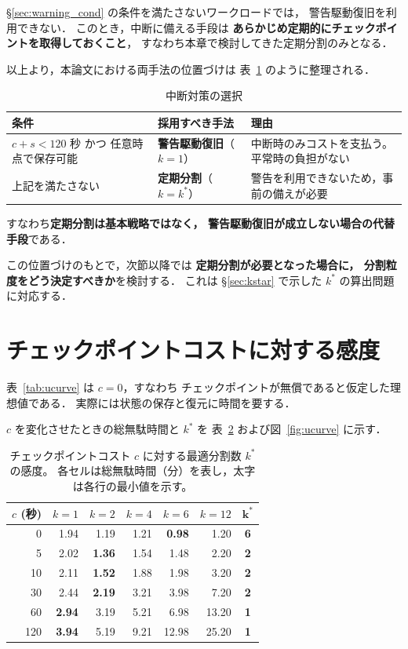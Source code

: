 \documentclass[11pt,a4paper]{ltjsreport}
\begin{document}
\S\ref{sec:warning_cond} の条件を満たさないワークロードでは，
警告駆動復旧を利用できない．
このとき，中断に備える手段は
\textbf{あらかじめ定期的にチェックポイントを取得しておくこと}，
すなわち本章で検討してきた定期分割のみとなる．

以上より，本論文における両手法の位置づけは
表~\ref{tab:strategy_role} のように整理される．

\begin{table}[htbp]
\centering
\caption{中断対策の選択}
\label{tab:strategy_role}
\small
\begin{tabularx}{\textwidth}{@{}lXX@{}}
\toprule
条件 & 採用すべき手法 & 理由 \\
\midrule
$c + s < 120$ 秒 かつ
任意時点で保存可能
  & \textbf{警告駆動復旧}（$k=1$）
  & 中断時のみコストを支払う。平常時の負担がない \\
\addlinespace
上記を満たさない
  & \textbf{定期分割}（$k = k^{*}$）
  & 警告を利用できないため，事前の備えが必要 \\
\bottomrule
\end{tabularx}
\end{table}

すなわち\textbf{定期分割は基本戦略ではなく，
警告駆動復旧が成立しない場合の代替手段}である．

この位置づけのもとで，次節以降では
\textbf{定期分割が必要となった場合に，
分割粒度をどう決定すべきか}を検討する．
これは \S\ref{sec:kstar} で示した $k^{*}$ の算出問題に対応する．

\section{チェックポイントコストに対する感度}
\label{sec:sensitivity}

表~\ref{tab:ucurve} は $c = 0$，すなわち
チェックポイントが無償であると仮定した理想値である．
実際には状態の保存と復元に時間を要する．

$c$ を変化させたときの総無駄時間と $k^{*}$ を
表~\ref{tab:sensitivity} および図~\ref{fig:ucurve} に示す．

\begin{table}[htbp]
\centering
\caption{チェックポイントコスト $c$ に対する最適分割数 $k^{*}$ の感度。
各セルは総無駄時間（分）を表し，太字は各行の最小値を示す。}
\label{tab:sensitivity}
\small
\begin{tabular}{@{}rrrrrrc@{}}
\toprule
$c$ (秒) & $k{=}1$ & $k{=}2$ & $k{=}4$ & $k{=}6$ & $k{=}12$ & $\mathbf{k^{*}}$ \\
\midrule
0   & 1.94 & 1.19 & 1.21 & \textbf{0.98} & 1.20 & \textbf{6} \\
5   & 2.02 & \textbf{1.36} & 1.54 & 1.48 & 2.20 & \textbf{2} \\
10  & 2.11 & \textbf{1.52} & 1.88 & 1.98 & 3.20 & \textbf{2} \\
30  & 2.44 & \textbf{2.19} & 3.21 & 3.98 & 7.20 & \textbf{2} \\
60  & \textbf{2.94} & 3.19 & 5.21 & 6.98 & 13.20 & \textbf{1} \\
120 & \textbf{3.94} & 5.19 & 9.21 & 12.98 & 25.20 & \textbf{1} \\
\bottomrule
\end{tabular}
\end{table}
\end{document}
